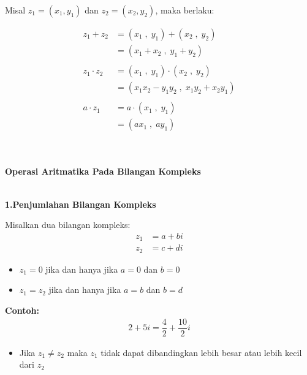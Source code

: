 \documentclass{article}
\begin{document}
Misal $ z_1 = ( x_1 , y_1 )  $ dan $ z_2 = ( x_2 , y_2 ) $, maka berlaku:

\begin{align}
    z_1 + z_2     & = ( x_1 \;,\; y_1 ) + ( x_2 \;,\; y_2 )
    \nonumber                                                       \\
                  & = ( x_1 + x_2 \;,\; y_1 + y_2 )
    \\\nonumber\\
    z_1 \cdot z_2 & = ( x_1 \;,\; y_1 ) \cdot ( x_2 \;,\; y_2 )
    \nonumber                                                       \\
                  & = ( x_1 x_2 - y_1 y_2 \;,\; x_1 y_2 + x_2 y_1 )
    \\\nonumber\\
    a \cdot z_1   & = a \cdot ( x_1 \;,\; y_1 )
    \nonumber                                                       \\
                  & = ( ax_1 \;,\; ay_1 )
\end{align}
\\ \\

\newpage
\begin{center}
    \textbf{Operasi Aritmatika Pada Bilangan Kompleks}
\end{center}
\leavevmode\\

\textbf{1.\>Penjumlahan Bilangan Kompleks\\}

Misalkan dua bilangan kompleks:
\begin{align}
    z_1 & = a + bi
    \nonumber      \\
    z_2 & = c + di
    \nonumber
\end{align}

\begin{itemize}
    \item $z_1 = 0$ jika dan hanya jika $a = 0$ dan $b = 0$
    \item $z_1 = z_2$ jika dan hanya jika $a = b$ dan $b = d$
\end{itemize}

\textbf{Contoh:}
\begin{align}
    2 + 5i = \dfrac{4}{2} + \dfrac{10}{2}i \nonumber
\end{align}
\begin{itemize}
    \item Jika $z_1 \neq z_2$ maka $z_1$ tidak dapat dibandingkan lebih besar atau lebih kecil dari $z_2$
\end{itemize}
\leavevmode
\\\\
\end{document}
